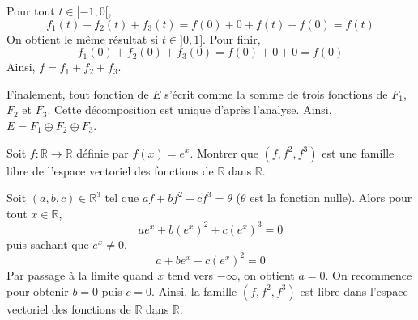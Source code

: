 \documentclass[a4paper,twoside,french,11pt]{VcCours}
\begin{document}
\medskip

Pour tout $t \in [-1,0[$,
$$ f_1(t)+f_2(t)+f_3(t) = f(0) + 0 + f(t)-f(0) = f(t)$$
On obtient le même résultat si $t \in ]0,1]$. Pour finir,
$$ f_1(0)+f_2(0)+f_3(0) = f(0) + 0 + 0 = f(0)$$
Ainsi, $f=f_1+f_2+f_3$.

\medskip

Finalement, tout fonction de $E$ s'écrit comme la somme de trois fonctions de $F_1$, $F_2$ et $F_3$. Cette décomposition est unique d'après l'analyse. Ainsi, $E = F_1 \oplus F_2 \oplus F_3$.

\begin{Exercice}{} Soit $f : \mathbb{R} \rightarrow \mathbb{R}$ définie par $f(x)=e^x$. Montrer que $(f,f^2,f^3)$ est une famille libre de l'espace vectoriel des fonctions de $\mathbb{R}$ dans $\mathbb{R}$.
\end{Exercice}

\corr Soit $(a,b,c) \in \mathbb{R}^3$ tel que $af+bf^2+cf^3 = \theta$ ($\theta$ est la fonction nulle). Alors pour tout $x \in \mathbb{R}$,
$$ a e^x+ b (e^x)^2 + c(e^x)^3 = 0 $$
puis sachant que $e^x \neq 0$,
$$ a + be^x + c (e^x)^2 = 0$$
Par passage à la limite quand $x$ tend vers $- \infty$, on obtient $a=0$. On recommence pour obtenir $b=0$ puis $c=0$. Ainsi, la famille $(f,f^2,f^3)$ est libre dans l'espace vectoriel des fonctions de $\mathbb{R}$ dans $\mathbb{R}$.



%
%
%    
%    
%    
%    

%
%
%
%
%
\end{document}
